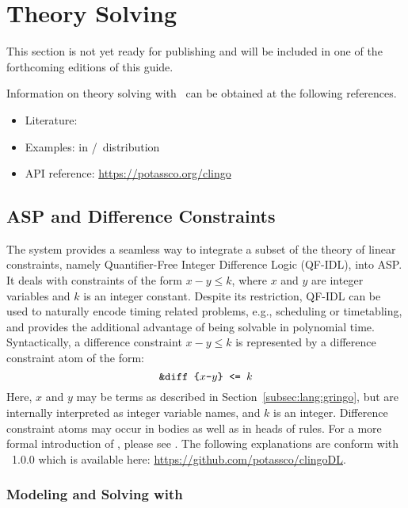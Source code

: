 \section{Theory Solving}\label{sec:theory}

This section is not yet ready for publishing
and will be included in one of the forthcoming editions of this guide.

Information on theory solving with \clingo\ can be obtained at the following references.

\begin{itemize}
\item Literature: \cite{gekakaosscwa16a,kascwa17a}
\item Examples:  in \gringo/\clingo\ distribution
\item API reference: \url{https://potassco.org/clingo}
\end{itemize}

\subsection{ASP and Difference Constraints}
\label{sec:difference:constraints}

The system  provides a seamless way to integrate a subset of the theory of linear constraints, namely Quantifier-Free Integer Difference Logic (QF-IDL), into ASP.
It deals with constraints of the form $x-y\leq k$, where $x$ and $y$ are integer variables and $k$ is an integer constant.
Despite its restriction, QF-IDL can be used to naturally encode timing related problems, e.g., scheduling or timetabling, and provides the additional advantage of being solvable in polynomial time.
Syntactically, a difference constraint $x-y\leq k$ is represented by a difference constraint atom of the form:
 \[
    \texttt{\&diff\text{ }\{$x$-$y$\}\text{ }<=\text{ }$k$}
 \]
Here, $x$ and $y$ may be terms as described in Section~\ref{subsec:lang:gringo}, but are internally interpreted as integer variable names,
and $k$ is an integer.
Difference constraint atoms may occur in bodies as well as in heads of rules.
For a more formal introduction of , please see \cite{jakaosscscwa17a}.
The following explanations are conform with ~1.0.0 which is available here: \url{https://github.com/potassco/clingoDL}.


\subsubsection{Modeling and Solving with }

